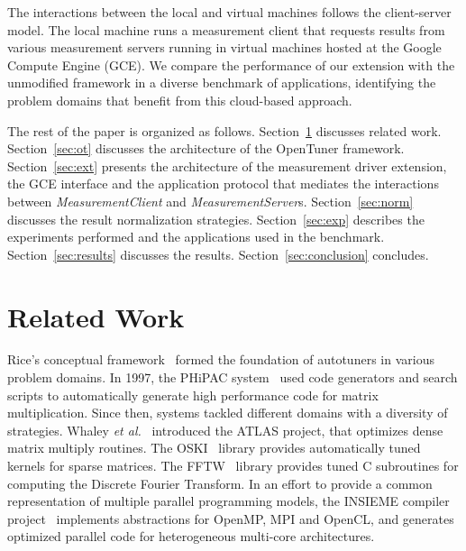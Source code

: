 \documentclass[a4paper, 12pt]{article}
\begin{document}
The interactions between the local and virtual machines follows
the client-server model. The local machine runs a measurement client that
requests results from various measurement servers running in virtual machines
hosted at the Google Compute Engine (GCE).
We compare the performance of our extension with the
unmodified framework in a diverse benchmark of applications, identifying
the problem domains that benefit from this cloud-based approach.


The rest of the paper is organized as follows.
Section~\ref{sec:related} discusses related work.
Section~\ref{sec:ot} discusses the architecture of the OpenTuner framework.
Section~\ref{sec:ext} presents the architecture of the measurement driver
extension, the GCE interface and the application protocol
that mediates the interactions between \emph{MeasurementClient} and
\emph{MeasurementServer}s.
Section~\ref{sec:norm} discusses the result normalization strategies.
Section~\ref{sec:exp} describes the experiments performed and the
applications used in the benchmark.
Section~\ref{sec:results} discusses the results.
Section~\ref{sec:conclusion} concludes.

\section{Related Work} \label{sec:related}

Rice's conceptual framework~\cite{rice1976algorithm} formed the foundation
of autotuners in various problem domains.  In 1997, the PHiPAC
system~\cite{bilmes1997phipac} used code generators and search scripts to
automatically generate high performance code
for matrix multiplication. Since then, systems tackled different domains with a
diversity of strategies. Whaley \emph{et al.}~\cite{whaley1998atlas} introduced
the ATLAS project, that optimizes dense matrix multiply routines. The
OSKI~\cite{vuduc2005oski} library provides automatically tuned kernels for
sparse matrices. The FFTW~\cite{frigo1998fftw} library provides tuned C
subroutines for computing the Discrete Fourier Transform.  In an effort to
provide a common representation of multiple parallel programming models, the
INSIEME compiler project~\cite{jordan2012multi} implements abstractions for
OpenMP, MPI and OpenCL, and generates optimized parallel code for heterogeneous
multi-core architectures.
\end{document}
